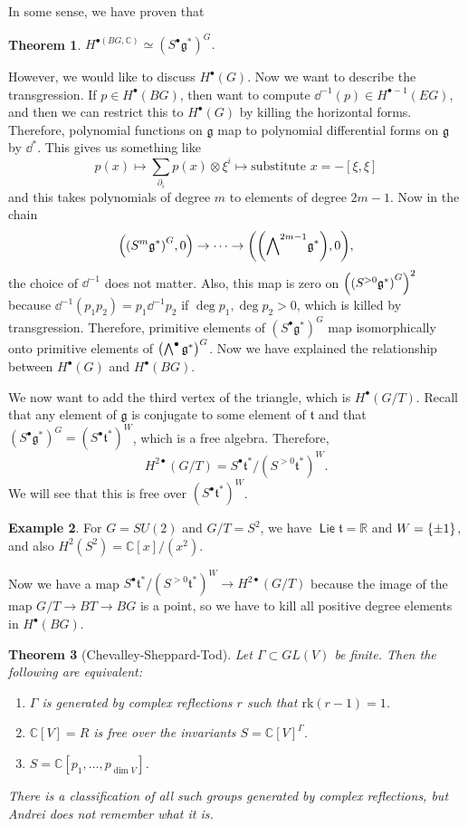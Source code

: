 \documentclass[leqno, openany]{memoir}
\newtheorem{thm}{Theorem}[section]
\theoremstyle{definition}
\newtheorem{exm}[thm]{Example}
\theoremstyle{remark}
\theoremstyle{plain}
\theoremstyle{definition}
\theoremstyle{remark}
\newcommand{\R}{\mathbb{R}}
\newcommand{\C}{\mathbb{C}}
\newcommand{\mf}[1]{\mathfrak{#1}}
\newcommand{\mr}[1]{\mathrm{#1}}
\DeclareMathOperator{\Lie}{\mathsf{Lie}}
\begin{document}
In some sense, we have proven that \begin{thm} $H^{\bullet(BG, \C)} \simeq
{(S^{\bullet} \mf{g}^*)}^G$.  \end{thm}

However, we would like to discuss $H^{\bullet}(G)$. Now we want to describe the
transgression. If $p \in H^{\bullet}(BG)$, then want to compute $\dd^{-1}(p)
\in H^{\bullet - 1}(EG)$, and then we can restrict this to $H^{\bullet}(G)$ by
killing the horizontal forms. Therefore, polynomial functions on $\mf{g}$ map
to polynomial differential forms on $\mf{g}$ by $\dd^*$. This gives us
something like \[ p(x) \mapsto \sum_{\partial_i} p(x) \otimes \xi^i \mapsto
\text{substitute $x = -[\xi, \xi]$} \] and this takes polynomials of degree $m$
to elements of degree $2m-1$. Now in the chain \[ \qty( {(S^m\mf{g}^*)}^G, 0 )
\to \cdots \to \qty(\qty({\bigwedge}^{2m-1} \mf{g}^*), 0), \] the choice of
$\dd^{-1}$ does not matter. Also, this map is zero on ${\qty({(S^{>0}
\mf{g}^*)}^G)}^2$ because $\dd^{-1} (p_1p_2) = p_1 \dd^{-1}p_2$ if $\deg p_1,
\deg p_2 > 0$, which is killed by transgression. Therefore, primitive elements
of ${(S^{\bullet}\mf{g}^*)}^G$ map isomorphically onto primitive elements of
${\qty(\bigwedge^{\bullet} \mf{g}^*)}^G$. Now we have explained the
relationship between $H^{\bullet}(G)$ and $H^{\bullet}(BG)$. 

We now want to add the third vertex of the triangle, which is
$H^{\bullet}(G/T)$. Recall that any element of $\mf{g}$ is conjugate to some
element of $\mf{t}$ and that ${(S^{\bullet} \mf{g}^*)}^G = {(S^{\bullet}
\mf{t}^*)}^W$, which is a free algebra. Therefore, \[ H^{2\bullet}(G/T) =
S^{\bullet} \mf{t^*} / {(S^{>0} \mf{t}^*)}^W. \] We will see that this is free
over ${(S^{\bullet} \mf{t}^*)}^W$.  \begin{exm} For $G = SU(2)$ and $G/T =
    S^2$, we have $\Lie \mf{t} = \R$ and $W = \qty{\pm 1}$, and also $H^2(S^2)
    = \C[x] / (x^2)$.  \end{exm}

Now we have a map $S^{\bullet} \mf{t}^* / {(S^{>0} \mf{t}^*)}^W \to H^{2
\bullet}(G/T)$ because the image of the map $G/T \to BT \to BG$ is a point, so
we have to kill all positive degree elements in $H^{\bullet}(BG)$.

\begin{thm}[Chevalley-Sheppard-Tod] Let $\Gamma \subset GL(V)$ be finite. Then
    the following are equivalent: \begin{enumerate} \item $\Gamma$ is generated
        by complex reflections $r$ such that $\mr{rk}(r-1) = 1$.  \item $\C[V]
        = R$ is free over the invariants $S = {\C[V]}^{\Gamma}$.  \item $S =
\C[p_1, \ldots, p_{\dim V}]$.  \end{enumerate} There is a classification of all
such groups generated by complex reflections, but Andrei does not remember what
it is.  \end{thm}
\end{document}
